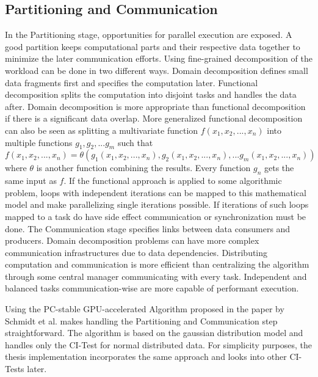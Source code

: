 \subsection{Partitioning and Communication}
In the Partitioning stage, opportunities for parallel execution are exposed. A good partition keeps computational parts and their respective data together to minimize the later communication efforts. Using fine-grained decomposition of the workload can be done in two different ways. Domain decomposition defines small data fragments first and specifies the computation later. Functional decomposition splits the computation into disjoint tasks and handles the data after. Domain decomposition is more appropriate than functional decomposition if there is a significant data overlap.
More generalized functional decomposition can also be seen as splitting a multivariate function $f(x_1,x_2,...,x_n)$ into multiple functions ${g_1,g_2,...g_m}$ such that $f(x_1,x_2,...,x_n) = \theta(g_1(x_1,x_2,...,x_n),g_2(x_1,x_2,...,x_n),...g_m(x_1,x_2,...,x_n))$ where $\theta$ is another function combining the results. Every function $g_n$ gets the same input as $f$. If the functional approach is applied to some algorithmic problem, loops with independent iterations can be mapped to this mathematical model and make parallelizing single iterations possible. If iterations of such loops mapped to a task do have side effect communication or synchronization must be done.
The Communication stage specifies links between data consumers and producers. Domain decomposition problems can have more complex communication infrastructures due to data dependencies. Distributing computation and communication is more efficient than centralizing the algorithm through some central manager communicating with every task. Independent and balanced tasks communication-wise are more capable of performant execution.

Using the PC-stable GPU-accelerated Algorithm proposed in the paper by Schmidt et al. \cite{schmidtOrderIndependentConstraintBasedCausal2018} makes handling the Partitioning and Communication step straightforward. The algorithm is based on the gaussian distribution model and handles only the CI-Test for normal distributed data. For simplicity purposes, the thesis implementation incorporates the same approach and looks into other CI-Tests later.

